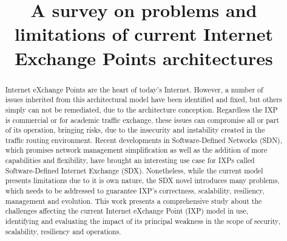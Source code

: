 \documentclass[conference]{IEEEtran/IEEEtran}
\begin{document}
\title{A survey on problems and limitations of current Internet Exchange Points architectures}

\author{
}


\maketitle

\begin{abstract}
Internet eXchange Points are the heart of today's Internet. However, a number of issues inherited from this architectural model have been identified and fixed, but others simply can not be remediated, due to the architecture conception. Regardless the IXP is commercial or for academic traffic exchange, these issues can compromise all or part of its operation, bringing risks, due to the insecurity and instability created in the traffic routing environment. Recent developments in Software-Defined Networks (SDN), which promises network management simplification as well as the addition of more capabilities and flexibility, have brought an interesting use case for IXPs called Software-Defined Internet Exchange (SDX). Nonetheless, while the current model presents limitations due to it is own nature, the SDX novel introduces many problems, which needs to be addressed to guarantee IXP's correctness, scalability, resiliency, management and evolution. This work presents a comprehensive study about the challenges affecting the current Internet eXchange Point (IXP) model in use, identifying and evaluating the impact of its principal weakness in the scope of security, scalability, resiliency and operations. 
\end{abstract}
\end{document}
